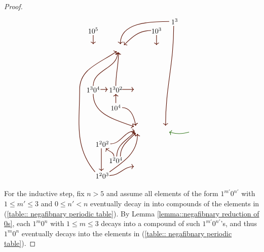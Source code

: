 \documentclass[reqno]{amsart}
\theoremstyle{definition}
\begin{document}
\begin{proof}
\begin{equation*}
\begin{tikzpicture}[scale = 0.45, color=OliveGreen]
            \draw[<-,thick] (3.4,-0.2) to[out=-15, in=-165] (5.6,-0.2);
            \draw node[text=black] at (-2.5,4.5) {$1^30^2$};
            \draw node[text=black] at (-5,4.5) {$1^30^4$};
            \draw node[text=black] at (-2.5,2.5) {$10^4$};
            \draw node[text=black] at (-4,-1.5) {$1^20^2$};
            \draw node[text=black] at (-2.5,-3.3) {$1^20^4$};
            \draw node[text=black] at (-4,-5) {$1^20^3$};
            \draw node[text=black] at (2,11) {$10^3$};
            \draw node[text=black] at (4,12) {$1^3$};
            \draw node[text=black] at (-5,11) {$10^5$};
            \draw[->,thick, color=Sepia] (-1.8,4.5) to[out=right, in=left] (-0.5,4.5);
            \draw[->,thick, color=Sepia] (-4.2,4.5) to[out=right, in=left] (-3.4,4.5);
            \draw[<-,thick, color=Sepia] (-2.5,4) to[out=down, in=up] (-2.5,3);
            \draw[->,thick, color=Sepia] (-1.8,2.5) to[out=right, in=100] (-0.3,0.5);
            \draw[->,thick, color=Sepia] (-5,4) to[out=down, in=160] (-0.5,0.4);
            \draw[->,thick, color=Sepia] (-2.5,4.9) to[out=up, in=down] (-2.2,8.6);
            \draw[->,thick, color=Sepia] (-5,4.9) to[out=up, in=down] (-2.3,8.6);
            \draw[->,thick, color=Sepia] (-2.7,-2.9) to[out=up, in=-45] (-3.6,-2);
            \draw[->,thick, color=Sepia] (-3.1,-1.5) to[out=right, in=left] (-0.4,-0.1);
            \draw[->,thick, color=Sepia] (-4.1,-2) to[out=down, in=up] (-4.1,-4.5);
            \draw[->,thick, color=Sepia] (-2,-2.9) to[out=up, in=-135] (-0.3,-0.3);
            \draw[->,thick, color=Sepia] (-2.4,-2.9) to[out=up, in=-135] (-0.4,-0.2);
            \draw[->,thick, color=Sepia] (-3.2,-4.6) to[out=35, in=down] (-0.1,-0.4);
            \draw[->,thick, color=Sepia] (-3.2,-5) to[out=right, in=left] (-0.5,-4);
            \draw[->,thick, color=Sepia] (-4.8,-4.6) to[out=130, in=down] (-6.5,4.5) to[out=up, in=-145] (-2.4,8.7);
            \draw[->,thick, color=Sepia] (2,10.5) to[out=down, in=up] (2,9.4);
            \draw[->,thick, color=Sepia] (1.4,11) to[out=left, in=45] (-1.6,9.4);
            \draw[->,thick, color=Sepia] (3.4,12) to[out=left, in=up] (-2,9.5);
            \draw[->,thick, color=Sepia] (3.9,11.5) to[out=down, in=up] (3,0.5);
            \draw[->,thick, color=Sepia] (-5,10.5) to[out=down, in=up] (-5,9.5);
        \end{tikzpicture}
    \end{equation*}

    For the inductive step, fix $n>5$ and assume all elements of the form $1^{m'}0^{n'}$ with $1\leq m'\leq 3$ and $0\leq n'<n$ eventually decay in into compounds of the elements in (\ref{table:: negafibnary periodic table}). By Lemma \ref{lemma::negafibnary reduction of 0s}, each $1^m0^n$ with $1\leq m\leq 3$ decays into a compound of such $1^{m'}0^{n'}$'s, and thus $1^m0^n$ eventually decays into the elements in (\ref{table:: negafibnary periodic table}).
\end{proof}
\end{document}
